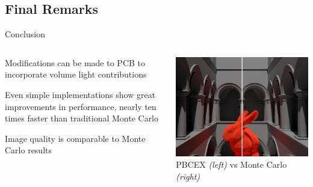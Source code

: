 \documentclass[10pt,compress,professionalfont]{beamer}
\begin{document}
\subsection{Final Remarks}
\begin{frame}{Conclusion}

    \begin{columns}
        \begin{column}{0.5\textwidth}

            Modifications can be made to PCB to incorporate volume light contributions\\
            \vspace{8mm}

            Even simple implementations show great improvements in performance, nearly ten times faster than traditional Monte Carlo\\
            \vspace{8mm}

            Image quality is comparable to Monte Carlo results

        \end{column}
        \begin{column}{0.5\textwidth}
            \includegraphics[width=\textwidth]{../img/compare}\\
            {\centering\scriptsize PBCEX \textit{(left)} vs Monte Carlo \textit{(right)} \\}
        \end{column}
    \end{columns}

\end{frame}
\end{document}
